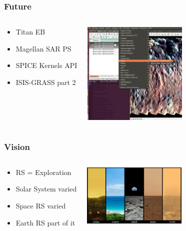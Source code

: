 \documentclass[serif,mathserif]{beamer}
\begin{document}

\begin{frame}
  \frametitle{Future}
  \begin{columns}
 \begin{center}
 \begin{itemize}
  \item Titan EB
  \item Magellan SAR PS
  \item SPICE Kernels API
  \item ISIS-GRASS part 2
 \end{itemize}
 \end{center}

 \begin{center}
  \includegraphics[width=5cm]{ISISGRASSCeres}
 \end{center}
 \end{columns}
\end{frame}


\begin{frame}
  \frametitle{Vision}
  \begin{columns}
 \begin{center}
 \begin{itemize}
  \item RS = Exploration
  \item Solar System varied
  \item Space RS varied
  \item Earth RS part of it
 \end{itemize}
 \end{center}

 \begin{center}
  \includegraphics[width=5cm]{PlanetarySurfaces}
 \end{center}
 \end{columns}
\end{frame}
\end{document}

